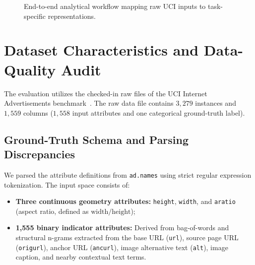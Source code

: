 \documentclass[11pt,a4paper]{article}
\begin{document}
\begin{figure}[H]
\centering
{}
\caption{End-to-end analytical workflow mapping raw UCI inputs to task-specific representations.}
\label{fig:pipeline}
\end{figure}

\section{Dataset Characteristics and Data-Quality Audit}
\label{sec:data_audit}

The evaluation utilizes the checked-in raw files of the UCI Internet Advertisements benchmark~\cite{kushmerick1999internet}. The raw data file contains $3{,}279$ instances and $1{,}559$ columns ($1{,}558$ input attributes and one categorical ground-truth label).

\subsection{Ground-Truth Schema and Parsing Discrepancies}
We parsed the attribute definitions from \texttt{ad.names} using strict regular expression tokenization. The input space consists of:
\begin{itemize}[noitemsep,topsep=2pt]
    \item \textbf{Three continuous geometry attributes:} \texttt{height}, \texttt{width}, and \texttt{aratio} (aspect ratio, defined as $\text{width}/\text{height}$);
    \item \textbf{1,555 binary indicator attributes:} Derived from bag-of-words and structural n-grams extracted from the base URL (\texttt{url}), source page URL (\texttt{origurl}), anchor URL (\texttt{ancurl}), image alternative text (\texttt{alt}), image caption, and nearby contextual text terms.
\end{itemize}
\end{document}

